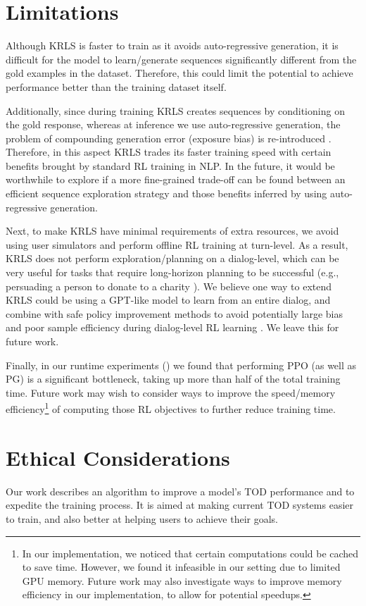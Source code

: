 \section{Limitations}
\label{sec:Limitations}
Although KRLS is faster to train as it avoids auto-regressive generation, it is difficult for the model to learn/generate sequences significantly different from the gold examples in the dataset. Therefore, this could limit the potential to achieve performance better than the training dataset itself.

Additionally, since during training KRLS creates sequences by conditioning on the gold response, whereas at inference we use auto-regressive generation, the problem of compounding generation error (exposure bias) is re-introduced \cite{ss-for-prediction, DAD, mixer}. Therefore, in this aspect KRLS trades its faster training speed with certain benefits brought by standard RL training in NLP. In the future, it would be worthwhile to explore if a more fine-grained trade-off can be found between an efficient sequence exploration strategy and those benefits inferred by using auto-regressive generation.

Next, to make KRLS have minimal requirements of extra resources, we avoid using user simulators and perform offline RL training at turn-level. As a result, KRLS does not perform exploration/planning on a dialog-level, which can be very useful for tasks that require long-horizon planning to be successful (e.g., persuading a person to donate to a charity \cite{p4g}). We believe one way to extend KRLS could be using a GPT-like model to learn from an entire dialog, and combine with safe policy improvement methods to avoid potentially large bias and poor sample efficiency during dialog-level RL learning \cite{caspi}. We leave this for future work.

Finally, in our runtime experiments () we found that performing PPO (as well as PG) is a significant bottleneck, taking up more than half of the total training time. Future work may wish to consider ways to improve the speed/memory efficiency\footnote{
In our implementation, we noticed that certain computations could be cached to save time. However, we found it infeasible in our setting due to limited GPU memory. Future work may also investigate ways to improve memory efficiency in our implementation, to allow for potential speedups.
} of computing those RL objectives to further reduce training time.
\section{Ethical Considerations}
Our work describes an algorithm to improve a model's TOD performance and to expedite the training process. It is aimed at making current TOD systems easier to train, and also better at helping users to achieve their goals.

